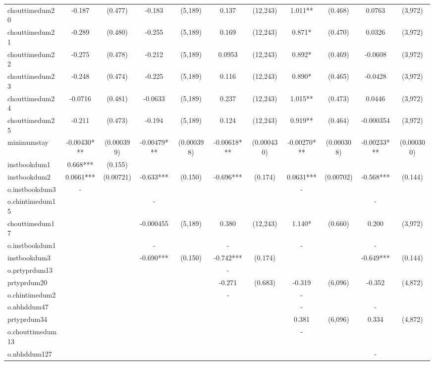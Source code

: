 \documentclass[]{article}
\begin{document}
\begin{tabular}{lcccccccccc}
chouttimedum20 & -0.187 & (0.477) & -0.183 & (5,189) & 0.137 & (12,243) & 1.011** & (0.468) & 0.0763 & (3,972) \\
chouttimedum21 & -0.289 & (0.480) & -0.255 & (5,189) & 0.169 & (12,243) & 0.871* & (0.470) & 0.0326 & (3,972) \\
chouttimedum22 & -0.275 & (0.478) & -0.212 & (5,189) & 0.0953 & (12,243) & 0.892* & (0.469) & -0.0608 & (3,972) \\
chouttimedum23 & -0.248 & (0.474) & -0.225 & (5,189) & 0.116 & (12,243) & 0.890* & (0.465) & -0.0428 & (3,972) \\
chouttimedum24 & -0.0716 & (0.481) & -0.0633 & (5,189) & 0.237 & (12,243) & 1.015** & (0.473) & 0.0446 & (3,972) \\
chouttimedum25 & -0.211 & (0.473) & -0.194 & (5,189) & 0.124 & (12,243) & 0.919** & (0.464) & -0.000354 & (3,972) \\
minimumstay & -0.00430*** & (0.000399) & -0.00479*** & (0.000398) & -0.00618*** & (0.000430) & -0.00270*** & (0.000308) & -0.00233*** & (0.000300) \\
instbookdum1 & 0.668*** & (0.155) &  &  &  &  &  &  &  &  \\
instbookdum2 & 0.0661*** & (0.00721) & -0.633*** & (0.150) & -0.696*** & (0.174) & 0.0631*** & (0.00702) & -0.568*** & (0.144) \\
o.instbookdum3 & - &  &  &  &  &  & - &  &  &  \\
o.chintimedum15 &  &  & - &  &  &  &  &  & - &  \\
chouttimedum17 &  &  & -0.000455 & (5,189) & 0.380 & (12,243) & 1.140* & (0.660) & 0.200 & (3,972) \\
o.instbookdum1 &  &  & - &  & - &  & - &  & - &  \\
instbookdum3 &  &  & -0.690*** & (0.150) & -0.742*** & (0.174) &  &  & -0.649*** & (0.144) \\
o.prtyprdum13 &  &  &  &  & - &  &  &  &  &  \\
prtyprdum20 &  &  &  &  & -0.271 & (0.683) & -0.319 & (6,096) & -0.352 & (4,872) \\
o.chintimedum2 &  &  &  &  & - &  & - &  &  &  \\
o.nbhddum47 &  &  &  &  &  &  & - &  & - &  \\
prtyprdum34 &  &  &  &  &  &  & 0.381 & (6,096) & 0.334 & (4,872) \\
o.chouttimedum13 &  &  &  &  &  &  & - &  &  &  \\
o.nbhddum127 &  &  &  &  &  &  &  &  & - &  \\

\end{tabular}
\end{document}
